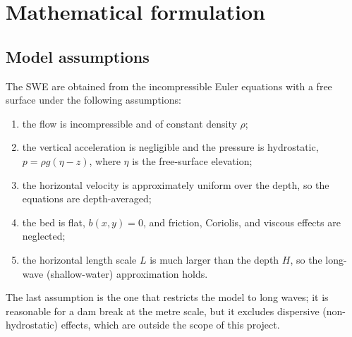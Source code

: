 ﻿\documentclass[11pt,a4paper]{article}
\begin{document}
\section{Mathematical formulation}
\label{sec:math}

\subsection{Model assumptions}
The SWE are obtained from the incompressible Euler equations with a free
surface under the following assumptions:
\begin{enumerate}[leftmargin=1.4em,itemsep=1pt,topsep=2pt]
\item the flow is incompressible and of constant density $\rho$;
\item the vertical acceleration is negligible and the pressure is hydrostatic,
      $p=\rho g(\eta-z)$, where $\eta$ is the free-surface elevation;
\item the horizontal velocity is approximately uniform over the depth, so the
      equations are depth-averaged;
\item the bed is flat, $b(x,y)=0$, and friction, Coriolis, and viscous effects
      are neglected;
\item the horizontal length scale $L$ is much larger than the depth $H$, so the
      long-wave (shallow-water) approximation holds.
\end{enumerate}
The last assumption is the one that restricts the model to long waves; it is
reasonable for a dam break at the metre scale, but it excludes dispersive
(non-hydrostatic) effects, which are outside the scope of this project.
\end{document}
